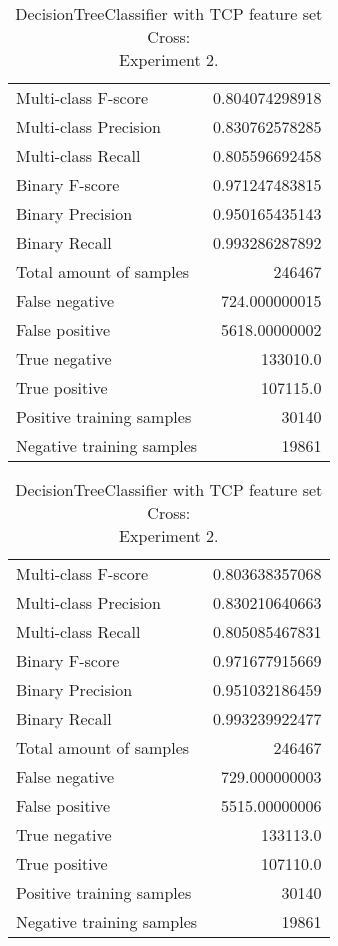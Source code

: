 \begin{table}[H]
\begin{minipage}{0.5\textwidth}
\caption{DecisionTreeClassifier with TCP feature set Cross: \\Experiment 1.}
\centering
\begin{tabular}{l r}
\toprule
Multi-class F-score & 0.804074298918 \\
Multi-class Precision & 0.830762578285 \\
Multi-class Recall & 0.805596692458 \\
\midrule
Binary F-score & 0.971247483815 \\
Binary Precision & 0.950165435143 \\
Binary Recall & 0.993286287892 \\
\midrule
Total amount of samples & 246467 \\
False negative & 724.000000015 \\
False positive & 5618.00000002 \\
True negative & 133010.0 \\
True positive & 107115.0 \\
\midrule
Positive training samples & 30140 \\
Negative training samples & 19861 \\
\bottomrule
\end{tabular}
\end{minipage}
\hfillx
\begin{minipage}{0.5\textwidth}
\caption{DecisionTreeClassifier with TCP feature set Cross: \\Experiment 2.}
\centering
\begin{tabular}{l r}
\toprule
Multi-class F-score & 0.803638357068 \\
Multi-class Precision & 0.830210640663 \\
Multi-class Recall & 0.805085467831 \\
\midrule
Binary F-score & 0.971677915669 \\
Binary Precision & 0.951032186459 \\
Binary Recall & 0.993239922477 \\
\midrule
Total amount of samples & 246467 \\
False negative & 729.000000003 \\
False positive & 5515.00000006 \\
True negative & 133113.0 \\
True positive & 107110.0 \\
\midrule
Positive training samples & 30140 \\
Negative training samples & 19861 \\
\bottomrule
\end{tabular}
\end{minipage}
\end{table}
